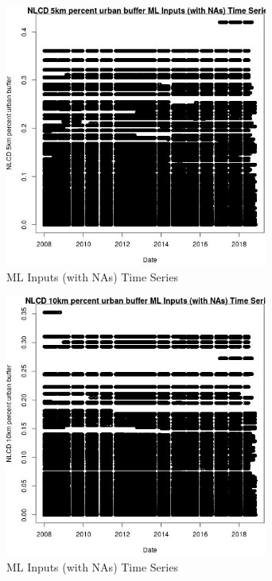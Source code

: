 \begin{figure} 
\centering  
\includegraphics[width=0.77\textwidth]{Code_Outputs/Report_ML_input_PM25_Step4_part_e_de_duplicated_aves_compiled_2019-05-20wNAs_NLCD_5km_percent_urban_buffervDate.jpg} 
\caption{\label{fig:Report_ML_input_PM25_Step4_part_e_de_duplicated_aves_compiled_2019-05-20wNAsNLCD_5km_percent_urban_buffervDate}ML Inputs (with NAs) Time Series} 
\end{figure} 
 

\begin{figure} 
\centering  
\includegraphics[width=0.77\textwidth]{Code_Outputs/Report_ML_input_PM25_Step4_part_e_de_duplicated_aves_compiled_2019-05-20wNAs_NLCD_10km_percent_urban_buffervDate.jpg} 
\caption{\label{fig:Report_ML_input_PM25_Step4_part_e_de_duplicated_aves_compiled_2019-05-20wNAsNLCD_10km_percent_urban_buffervDate}ML Inputs (with NAs) Time Series} 
\end{figure} 
 


